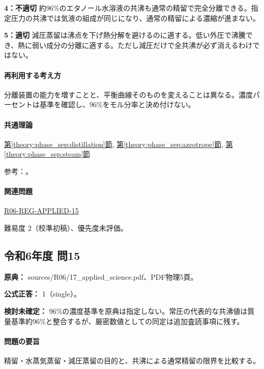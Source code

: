 \noindent\textbf{4：不適切} 約96\%のエタノール水溶液の共沸も通常の精留で完全分離できる。指定圧力の共沸では気液の組成が同じになり、通常の精留による濃縮が進まない。\par

\noindent\textbf{5：適切} 減圧蒸留は沸点を下げ熱分解を避けるのに適する。低い外圧で沸騰でき、熱に弱い成分の分離に適する。ただし減圧だけで全共沸が必ず消えるわけではない。\par

\paragraph{再利用する考え方} 分離装置の能力を増すことと、平衡曲線そのものを変えることは異なる。濃度パーセントは基準を確認し、96\%をモル分率と決め付けない。

\paragraph{共通理論} \hyperref[theory:phase_sep:distillation]{第\ref*{theory:phase_sep:distillation}節}, \hyperref[theory:phase_sep:azeotrope]{第\ref*{theory:phase_sep:azeotrope}節}, \hyperref[theory:phase_sep:steam]{第\ref*{theory:phase_sep:steam}節}

\par 参考：\cite{nptel_distillation1,nptel_azeotrope}。

\paragraph{関連問題} \hyperref[q:r06-reg-applied-15]{R06-REG-APPLIED-15}

\par 難易度 2（校準初稿）、優先度未評価。

\subsection{令和6年度 問15}
\label{q:r06-reg-applied-15}

\noindent\textbf{原典：} sources/R06/17\_applied\_science.pdf、PDF物理5頁。

\textbf{公式正答：} 1（single）。

\par\textbf{検討未確定：} 96\%の濃度基準を原典は指定しない。常圧の代表的な共沸値は質量基準約96\%と整合するが、厳密数値としての同定は追加査読事項に残す。

\paragraph{問題の要旨} 精留・水蒸気蒸留・減圧蒸留の目的と、共沸による通常精留の限界を比較する。


